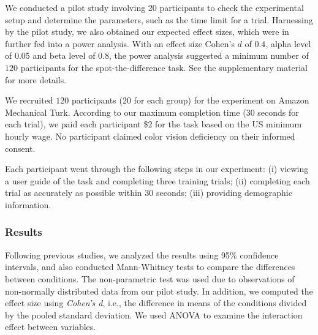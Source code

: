 \vspace{.3em}
We conducted a pilot study involving 20 participants to check the experimental setup and determine the parameters, such as the time limit for a trial.
Harnessing by the pilot study, we also obtained our expected effect sizes, which were in further fed into a power analysis. With an effect size Cohen's $d$ of $0.4$, alpha level of $0.05$ and beta level of $0.8$, the power analysis suggested a minimum number of $120$ participants for the spot-the-difference task. See the supplementary material for more details.

\vspace{.3em}
We recruited $120$ participants (20 for each group) for the experiment on Amazon Mechanical Turk.
According to our maximum completion time ($30$ seconds for each trial), we paid each participant \$$2$ for the task based on the US minimum hourly wage.
No participant claimed color vision deficiency on their informed consent.

\vspace{.3em}
Each participant went through the following steps in our experiment: (i) viewing a user guide of the task and completing three training trials; (ii) completing each trial as accurately as possible within $30$ seconds; (iii) providing demographic information.

\subsubsection{Results}

Following previous studies, we analyzed the results using 95\% confidence intervals, and also conducted Mann-Whitney tests to compare the differences between conditions. The non-parametric test was used due to observations of non-normally distributed data from our pilot study. In addition, we computed the effect size using \emph{Cohen's d}, i.e., the difference in means of the conditions divided by the pooled standard deviation. We used ANOVA to examine the interaction effect between variables.


